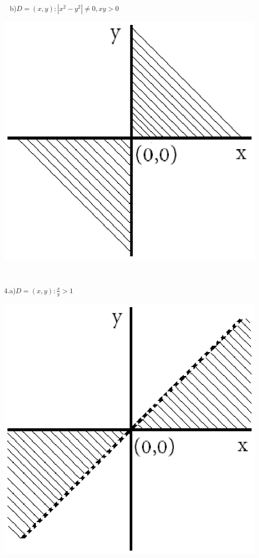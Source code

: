 \documentclass[11pt]{amsbook}
\begin{document}
	
	
	\centerline{\thepage}
	\bigskip
	
	\noindent
	\begin{minipage}{0.6\textwidth}\raggedright
		\quad\,\,\ b)\quad $D = {(x, y): |x^2 - y^2| \neq 0, xy>0}$
	\end{minipage}
	\hfill%
	\begin{minipage}{0.3\textwidth}
		\includegraphics[width=0.8\linewidth]{images/b2p2-278-2b.eps}
	\end{minipage}%
	\\
	\noindent
	\begin{minipage}{0.6\textwidth}\raggedright
		4.\quad a)\quad $D = {(x, y): \frac{x}{y} > 1}$
	\end{minipage}
	\hfill%
	\begin{minipage}{0.3\textwidth}
		\includegraphics[width=0.8\linewidth]{images/b2p2-278-4a.eps}
	\end{minipage}%
\end{document}
